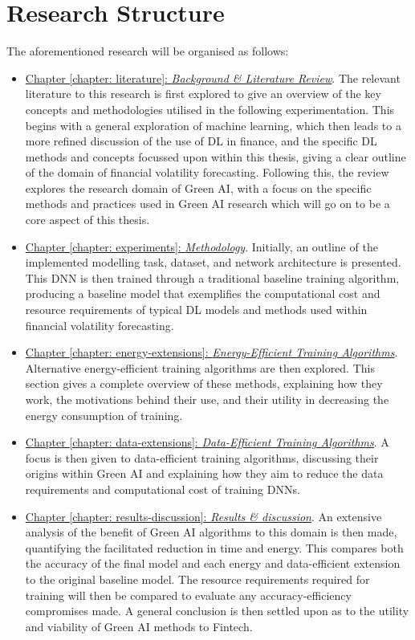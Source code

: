 \documentclass[a4paper, 11pt]{report}
\begin{document}
    \section{Research Structure}
    \label{section: structure}

    The aforementioned research will be organised as follows: 

    \begin{itemize}
        \item \underline{Chapter \ref{chapter: literature}: \emph{Background \& Literature Review}}. The relevant literature to this research is first explored to give an overview of the key concepts and methodologies utilised in the following experimentation. This begins with a general exploration of machine learning, which then leads to a more refined discussion of the use of DL in finance, and the specific DL methods and concepts focussed upon within this thesis, giving a clear outline of the domain of financial volatility forecasting. Following this, the review explores the research domain of Green AI, with a focus on the specific methods and practices used in Green AI research which will go on to be a core aspect of this thesis.
        
        \item \underline{Chapter \ref{chapter: experiments}: \emph{Methodology}}. Initially, an outline of the implemented modelling task, dataset, and network architecture is presented. This DNN is then trained through a traditional baseline training algorithm, producing a baseline model that exemplifies the computational cost and resource requirements of typical DL models and methods used within financial volatility forecasting.

        \item \underline{Chapter \ref{chapter: energy-extensions}: \emph{Energy-Efficient Training Algorithms}}. Alternative energy-efficient training algorithms are then explored. This section gives a complete overview of these methods, explaining how they work, the motivations behind their use, and their utility in decreasing the energy consumption of training.
        
        \item \underline{Chapter \ref{chapter: data-extensions}: \emph{Data-Efficient Training Algorithms}}. A focus is then given to data-efficient training algorithms, discussing their origins within Green AI and explaining how they aim to reduce the data requirements and computational cost of training DNNs.
        
        \item \underline{Chapter \ref{chapter: results-discussion}: \emph{Results \& discussion}}. An extensive analysis of the benefit of Green AI algorithms to this domain is then made, quantifying the facilitated reduction in time and energy. This compares both the accuracy of the final model and each energy and data-efficient extension to the original baseline model. The resource requirements required for training will then be compared to evaluate any accuracy-efficiency compromises made. A general conclusion is then settled upon as to the utility and viability of Green AI methods to Fintech.
    \end{itemize}
\end{document}
